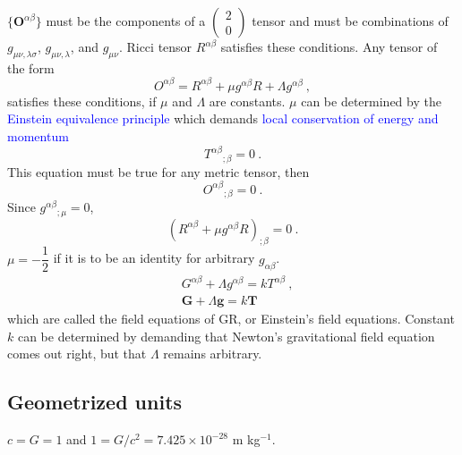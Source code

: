 \documentclass[12pt,a4paper]{article}
\begin{document}
$\{\textbf{O}^{\alpha\beta} \}$ must be the components of a $\left(\begin{smallmatrix} 2\\0 \end{smallmatrix} \right)$ tensor and must be combinations of $g_{\mu\nu,\lambda \sigma}$, $g_{\mu\nu,\lambda}$, and $g_{\mu\nu}$. Ricci tensor $R^{\alpha\beta}$ satisfies these conditions. Any tensor of the form
\begin{equation}
O^{\alpha\beta} = R^{\alpha\beta} +\mu g^{\alpha\beta} R +\Lambda g^{\alpha\beta} ~,
\end{equation}
satisfies these conditions, if $\mu$ and $\Lambda$ are constants. $\mu$ can be determined by the \textcolor{blue}{Einstein equivalence principle} which demands \textcolor{blue}{local conservation of energy and momentum}
\begin{equation}
T^{\alpha\beta}{}_{;\beta} = 0 ~.
\end{equation}
This equation must be true for any metric tensor, then
\begin{equation}
O^{\alpha\beta}{}_{;\beta} = 0 ~.
\end{equation}
Since $g^{\alpha\beta}{}_{;\mu} = 0$, 
\begin{equation}
(R^{\alpha\beta} +\mu g^{\alpha\beta}R)_{;\beta} = 0 ~.
\end{equation}
$\mu = -\dfrac{1}{2}$ if it is to be an identity for arbitrary $g_{\alpha\beta}$. 
\begin{align}
& G^{\alpha\beta} +\Lambda g^{\alpha\beta}  = k T^{\alpha\beta} ~, \\
& \textbf{G} +\Lambda \textbf{g} = k \textbf{T}
\end{align}
which are called the field equations of GR, or Einstein's field equations. Constant $k$ can be determined by demanding that Newton's gravitational field equation comes out right, but that $\Lambda$ remains arbitrary.

\subsection{Geometrized units}
$c = G = 1$ and $1 = G/c^2 = 7.425 \times 10^{-28}$ m kg$^{-1}$.
\end{document}
